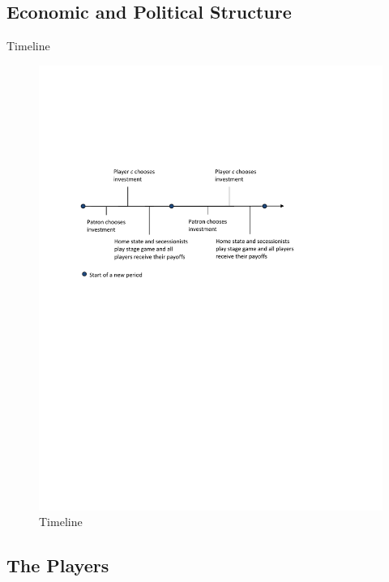 \documentclass{beamer}
\begin{document}
\subsection{Economic and Political Structure}
\begin{frame}{Timeline}
\pause
\begin{figure}
\includegraphics[width=\linewidth,height=\textheight,keepaspectratio]{Timeline2.pdf}
\caption{Timeline}
\end{figure}
\end{frame}


\subsection{The Players}
\end{document}
